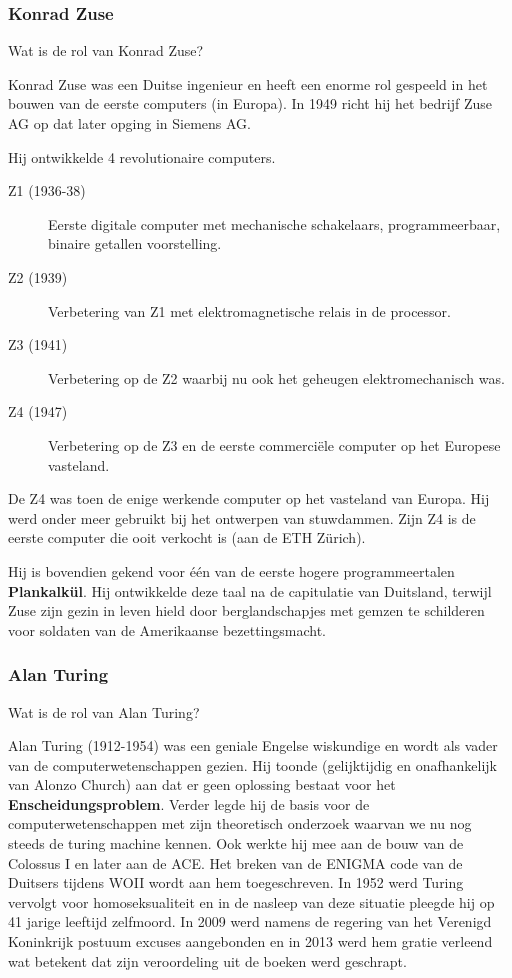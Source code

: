 \documentclass[../main.tex]{subfiles}
\begin{document}
\subsubsection{Konrad Zuse}
\begin{question}
Wat is de rol van Konrad Zuse?
\end{question}
\begin{solution}
Konrad Zuse was een Duitse ingenieur en heeft een enorme rol gespeeld in het bouwen van de eerste computers (in Europa).
In 1949 richt hij het bedrijf Zuse AG op dat later opging in Siemens AG.

Hij ontwikkelde 4 revolutionaire computers.
\begin{description}
		\item[Z1 (1936-38)] Eerste digitale computer met mechanische schakelaars, programmeerbaar, binaire getallen voorstelling.
		\item[Z2 (1939)] Verbetering van Z1 met elektromagnetische relais in de processor.
		\item[Z3 (1941)] Verbetering op de Z2 waarbij nu ook het geheugen elektromechanisch was.
		\item[Z4 (1947)] Verbetering op de Z3 en de eerste commerci\"ele computer op het Europese vasteland.
\end{description}
De Z4 was toen de enige werkende computer op het vasteland van Europa. Hij werd onder meer gebruikt bij het ontwerpen van stuwdammen. Zijn Z4 is de eerste computer die ooit verkocht is (aan de ETH Zürich).

Hij is bovendien gekend voor \'e\'en van de eerste hogere programmeertalen \textbf{Plankalk\"ul}. Hij ontwikkelde deze taal na de capitulatie van Duitsland, terwijl Zuse zijn gezin in leven hield door berglandschapjes met gemzen te schilderen voor soldaten van de Amerikaanse bezettingsmacht.
\end{solution}

\subsubsection{Alan Turing}
\begin{question}
Wat is de rol van Alan Turing?
\end{question}
\begin{solution}
Alan Turing (1912-1954) was een geniale Engelse wiskundige en wordt als vader van de computerwetenschappen gezien.
Hij toonde (gelijktijdig en onafhankelijk van Alonzo Church) aan dat er geen oplossing bestaat voor het \textbf{Enscheidungsproblem}.
Verder legde hij de basis voor de computerwetenschappen met zijn theoretisch onderzoek waarvan we nu nog steeds de turing machine kennen.
Ook werkte hij mee aan de bouw van de Colossus I en later aan de ACE.
Het breken van de ENIGMA code van de Duitsers tijdens WOII wordt aan hem toegeschreven.
In 1952 werd Turing vervolgt voor homoseksualiteit en in de nasleep van deze situatie pleegde hij op 41 jarige leeftijd zelfmoord. In 2009 werd namens de regering van het Verenigd Koninkrijk postuum excuses aangebonden en in 2013 werd hem gratie verleend wat betekent dat zijn veroordeling uit de boeken werd geschrapt.
\end{solution}
\end{document}
